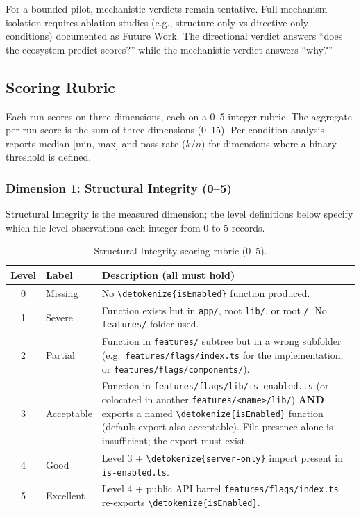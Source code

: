 \documentclass[12pt,a4paper]{report}
\newcommand{\code}[1]{\texttt{\nolinkurl{\detokenize{#1}}}}
\DeclareRobustCommand{\filename}[1]{\bgroup\urlstyle{tt}\nolinkurl{#1}\egroup}
\begin{document}
For a bounded pilot, mechanistic verdicts remain tentative. Full mechanism isolation requires ablation studies (e.g., structure-only vs directive-only conditions) documented as Future Work. The directional verdict answers ``does the ecosystem predict scores?'' while the mechanistic verdict answers ``why?''

\subsection{Scoring Rubric}
\label{sec:pilot-rubric}

Each run scores on three dimensions, each on a 0--5 integer rubric. The aggregate per-run score is the sum of three dimensions (0--15). Per-condition analysis reports median [min, max] and pass rate ($k/n$) for dimensions where a binary threshold is defined.

\subsubsection{Dimension 1: Structural Integrity (0--5)}

Structural Integrity is the measured dimension; the level definitions below specify which file-level observations each integer from 0 to 5 records.

\begin{table}[H]
\centering
\begin{tabular}{clp{9cm}}
\toprule
\textbf{Level} & \textbf{Label} & \textbf{Description (all must hold)} \\
\midrule
0 & Missing & No \code{isEnabled} function produced. \\
1 & Severe & Function exists but in \filename{app/}, root \filename{lib/}, or root \filename{/}. No \filename{features/} folder used. \\
2 & Partial & Function in \filename{features/} subtree but in a wrong subfolder (e.g.\ \filename{features/flags/index.ts} for the implementation, or \filename{features/flags/components/}). \\
3 & Acceptable & Function in \filename{features/flags/lib/is-enabled.ts} (or colocated in another \filename{features/<name>/lib/}) \textbf{AND} exports a named \code{isEnabled} function (default export also acceptable). File presence alone is insufficient; the export must exist. \\
4 & Good & Level 3 + \code{server-only} import present in \filename{is-enabled.ts}. \\
5 & Excellent & Level 4 + public API barrel \filename{features/flags/index.ts} re-exports \code{isEnabled}. \\
\bottomrule
\end{tabular}
\caption{Structural Integrity scoring rubric (0--5).}
\label{tab:rubric-structural}
\end{table}
\end{document}

